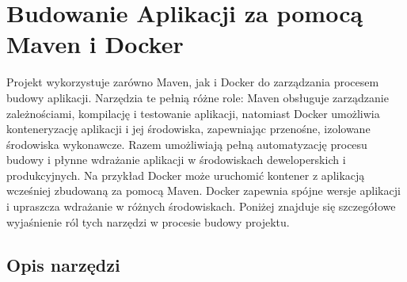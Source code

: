 \section{Budowanie Aplikacji za pomocą Maven i Docker}
Projekt wykorzystuje zarówno Maven, jak i Docker do zarządzania procesem budowy aplikacji. Narzędzia te pełnią różne role: Maven obsługuje zarządzanie zależnościami, kompilację i testowanie aplikacji, natomiast Docker umożliwia konteneryzację aplikacji i jej środowiska, zapewniając przenośne, izolowane środowiska wykonawcze. Razem umożliwiają pełną automatyzację procesu budowy i płynne wdrażanie aplikacji w środowiskach deweloperskich i produkcyjnych. Na przykład Docker może uruchomić kontener z aplikacją wcześniej zbudowaną za pomocą Maven. Docker zapewnia spójne wersje aplikacji i upraszcza wdrażanie w różnych środowiskach. Poniżej znajduje się szczegółowe wyjaśnienie ról tych narzędzi w procesie budowy projektu.

\subsection{Opis narzędzi}
